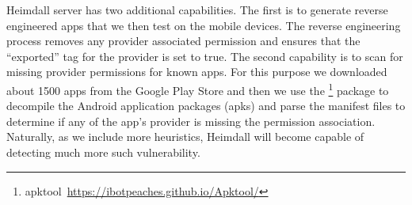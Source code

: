 Heimdall server has two additional capabilities. The first is to generate reverse engineered apps that we then test on the mobile devices. The reverse engineering process removes any provider associated permission and ensures that the ``exported'' tag for the provider is set to true. The second capability is to scan for missing provider permissions for known apps. For this purpose we downloaded about 1500 apps from the Google Play Store and then we use the \footnote{apktool~\url{https://ibotpeaches.github.io/Apktool/}} package to decompile the Android application packages (apks) and parse the manifest files to determine if any of the app's provider is missing the permission association. Naturally, as we include more heuristics, Heimdall will become capable of detecting much more such vulnerability.

